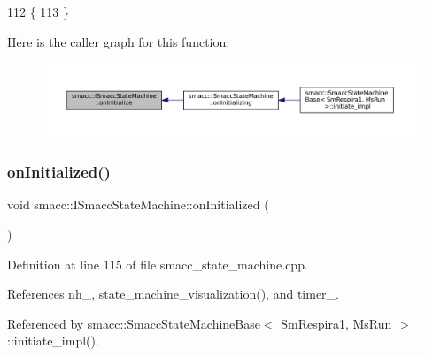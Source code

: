 \begin{DoxyCode}
112 \{
113 \}
\end{DoxyCode}
Here is the caller graph for this function\+:
\nopagebreak
\begin{figure}[H]
\begin{center}
\leavevmode
\includegraphics[width=350pt]{classsmacc_1_1ISmaccStateMachine_ac2982c6c8283663e5e1e8a7c82f511ec_icgraph}
\end{center}
\end{figure}
\mbox{\label{classsmacc_1_1ISmaccStateMachine_a95e7f71d0d88fffd0afebb1f9ccdade5}} 
\subsubsection{\texorpdfstring{on\+Initialized()}{onInitialized()}}
{\footnotesize\ttfamily void smacc\+::\+I\+Smacc\+State\+Machine\+::on\+Initialized (\begin{DoxyParamCaption}{ }\end{DoxyParamCaption})\hspace{0.3cm}{\ttfamily [protected]}}



Definition at line 115 of file smacc\+\_\+state\+\_\+machine.\+cpp.



References nh\+\_\+, state\+\_\+machine\+\_\+visualization(), and timer\+\_\+.



Referenced by smacc\+::\+Smacc\+State\+Machine\+Base$<$ Sm\+Respira1, Ms\+Run $>$\+::initiate\+\_\+impl().


